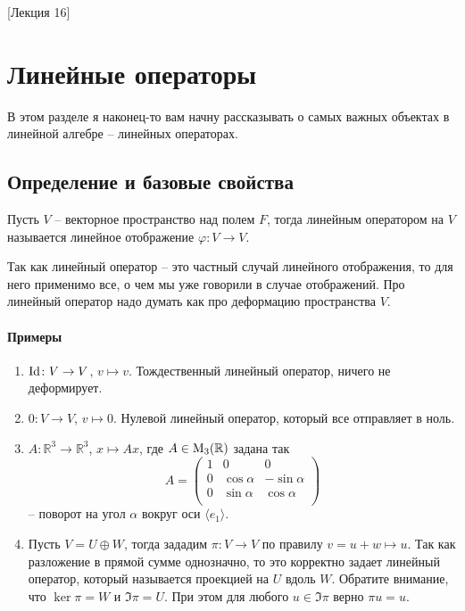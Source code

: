 [Лекция 16]

\newpage
\section{Линейные операторы}

В этом разделе я наконец-то вам начну рассказывать о самых важных объектах в линейной алгебре -- линейных операторах.

\subsection{Определение и базовые свойства}
\label{section::LinearOpDef}

\begin{definition}
Пусть $V$ -- векторное пространство над полем $F$, тогда линейным оператором на $V$ называется линейное отображение $\varphi \colon V\to V$.
\end{definition}

Так как линейный оператор -- это частный случай линейного отображения, то для него применимо все, о чем мы уже говорили в случае отображений.
Про линейный оператор надо думать как про деформацию пространства $V$.

\paragraph{Примеры}

\begin{enumerate}
\item $\operatorname{Id}\colon V\to V$, $v\mapsto v$.
Тождественный линейный оператор, ничего не деформирует.

\item $0\colon V\to V$, $v \mapsto 0$.
Нулевой линейный оператор, который все отправляет в ноль.

\item $A\colon \mathbb R^3 \to \mathbb R^3$, $x\mapsto Ax$, где $A\in \operatorname{M}_{3}(\mathbb R)$ задана так
\[
A = 
\begin{pmatrix}
{1}&{0}&{0}\\
{0}&{\cos \alpha}&{-\sin \alpha}\\
{0}&{\sin \alpha}&{\cos \alpha}\\
\end{pmatrix}
\]
-- поворот на угол $\alpha$ вокруг оси $\langle e_1\rangle$.

\item Пусть $V = U\oplus W$, тогда зададим $\pi\colon V\to V$ по правилу $v = u + w \mapsto u$.
Так как разложение в прямой сумме однозначно, то это корректно задает линейный оператор, который называется проекцией на $U$ вдоль $W$.
Обратите внимание, что $\ker \pi = W$ и $\Im \pi = U$.
При этом для любого $u\in \Im\pi$ верно $\pi u = u$.
\end{enumerate}

